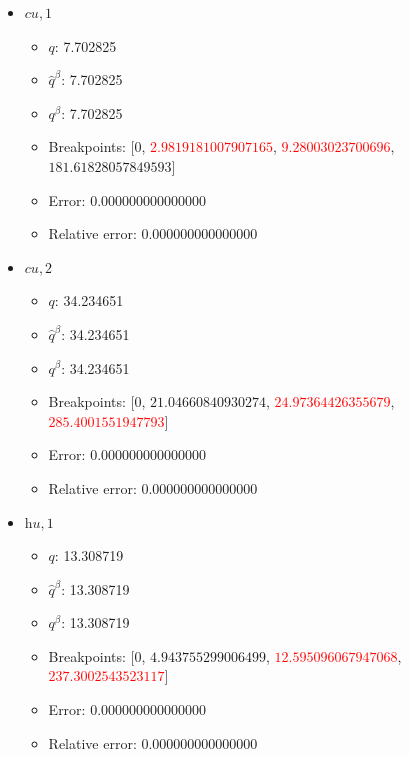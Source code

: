 \documentclass{article}%
\begin{document}
\begin{itemize}
\begin{itemize}
		\item Breakpoints: $[$\textcolor{red}{$0$}, \textcolor{red}{$38.943261778500734$}, $390.0$$]$%
		\item Error: 0.000000000000000%
		\item Relative error: 0.000000000000000%
	\end{itemize}%
	\item $\textit{cu},1$%
	\begin{itemize}%
		\item $q$: 7.702825%
		\item $\hat{q}^\beta$: 7.702825%
		\item $q^\beta$: 7.702825%
		\item Breakpoints: $[$$0$, \textcolor{red}{$2.9819181007907165$}, \textcolor{red}{$9.28003023700696$}, $181.61828057849593$$]$%
		\item Error: 0.000000000000000%
		\item Relative error: 0.000000000000000%
	\end{itemize}%
	\item $\textit{cu},2$%
	\begin{itemize}%
		\item $q$: 34.234651%
		\item $\hat{q}^\beta$: 34.234651%
		\item $q^\beta$: 34.234651%
		\item Breakpoints: $[$$0$, $21.04660840930274$, \textcolor{red}{$24.97364426355679$}, \textcolor{red}{$285.4001551947793$}$]$%
		\item Error: 0.000000000000000%
		\item Relative error: 0.000000000000000%
	\end{itemize}%
	\item $\textit{hu},1$%
	\begin{itemize}%
		\item $q$: 13.308719%
		\item $\hat{q}^\beta$: 13.308719%
		\item $q^\beta$: 13.308719%
		\item Breakpoints: $[$$0$, $4.943755299006499$, \textcolor{red}{$12.595096067947068$}, \textcolor{red}{$237.3002543523117$}$]$%
		\item Error: 0.000000000000000%
		\item Relative error: 0.000000000000000%
	\end{itemize}%
\end{itemize}%
\end{document}
